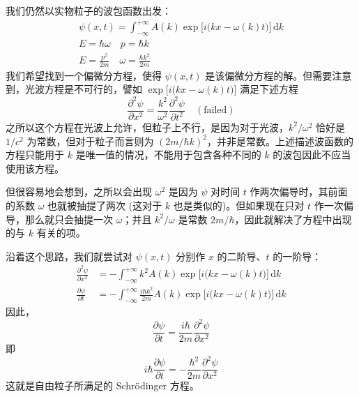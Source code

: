 我们仍然以实物粒子的波包函数出发：
\begin{gather}
  \psi(x, t) = \int_{- \infty}^{+ \infty} A(k) \exp \big[ i \big( k x - \omega(k) t \big) \big] \, \mathrm{d} k \\
  E = \hbar \omega \quad p = \hbar k \\
  E = \frac{p^2}{2 m} \quad \omega = \frac{\hbar k^2}{2 m}
\end{gather}
我们希望找到一个偏微分方程，使得 $\psi(x, t)$ 是该偏微分方程的解。但需要注意到，光波方程是不可行的，譬如 $\exp \big[ i \big( k x - \omega(k) t \big) \big]$ 满足下述方程
\begin{equation}
\frac{\partial^2 \psi}{\partial x^2} = \frac{k^2}{\omega^2} \frac{\partial^2 \psi}{\partial t^2} \quad \mathrm{(failed)}
\end{equation}
之所以这个方程在光波上允许，但粒子上不行，是因为对于光波，$k^2/\omega^2$ 恰好是 $1/c^2$ 为常数，但对于粒子而言则为 $(2m/\hbar k)^2$，并非是常数。上述描述波函数的方程只能用于 $k$ 是唯一值的情况，不能用于包含各种不同的 $k$ 的波包因此不应当使用该方程。

但很容易地会想到，之所以会出现 $\omega^2$ 是因为 $\psi$ 对时间 $t$ 作两次偏导时，其前面的系数 $\omega$ 也就被抽提了两次 (这对于 $k$ 也是类似的)。但如果现在只对 $t$ 作一次偏导，那么就只会抽提一次 $\omega$；并且 $k^2 / \omega$ 是常数 $2m/\hbar$，因此就解决了方程中出现的与 $k$ 有关的项。

沿着这个思路，我们就尝试对 $\psi(x, t)$ 分别作 $x$ 的二阶导、$t$ 的一阶导：
\begin{align}
  \frac{\partial^2 \psi}{\partial x^2} &= - \int_{- \infty}^{+ \infty} k^2 A(k) \exp \big[ i \big( k x - \omega(k) t \big) \big] \, \mathrm{d} k \\
  \frac{\partial \psi}{\partial t} &= - \int_{- \infty}^{+ \infty} \frac{i \hbar k^2}{2 m} A(k) \exp \big[ i \big( k x - \omega(k) t \big) \big] \, \mathrm{d} k
\end{align}
因此，
\begin{equation}
\frac{\partial \psi}{\partial t} = \frac{i \hbar}{2 m} \frac{\partial^2 \psi}{\partial x^2}
\end{equation}
即
\begin{equation}
i \hbar \frac{\partial \psi}{\partial t} = - \frac{\hbar^2}{2 m} \frac{\partial^2 \psi}{\partial x^2}
\end{equation}
这就是自由粒子所满足的 Schr\"odinger 方程。

